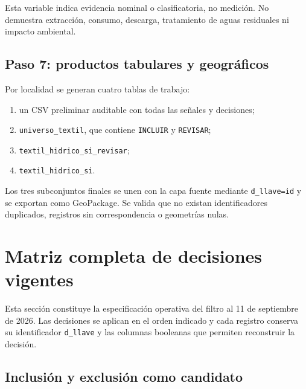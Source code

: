 \documentclass[11pt,letterpaper]{article}
\begin{document}
Esta variable indica evidencia nominal o clasificatoria, no medición. No demuestra extracción, consumo, descarga, tratamiento de aguas residuales ni impacto ambiental.

\subsection{Paso 7: productos tabulares y geográficos}

Por localidad se generan cuatro tablas de trabajo:

\begin{enumerate}
  \item un CSV preliminar auditable con todas las señales y decisiones;
  \item \texttt{universo\_textil}, que contiene \texttt{INCLUIR} y \texttt{REVISAR};
  \item \texttt{textil\_hidrico\_si\_revisar};
  \item \texttt{textil\_hidrico\_si}.
\end{enumerate}

Los tres subconjuntos finales se unen con la capa fuente mediante \texttt{d\_llave=id} y se exportan como GeoPackage. Se valida que no existan identificadores duplicados, registros sin correspondencia o geometrías nulas.

\section{Matriz completa de decisiones vigentes}

Esta secci\'on constituye la especificaci\'on operativa del filtro al 11 de septiembre de 2026. Las decisiones se aplican en el orden indicado y cada registro conserva su identificador \texttt{d\_llave} y las columnas booleanas que permiten reconstruir la decisi\'on.

\subsection{Inclusi\'on y exclusi\'on como candidato}
\end{document}
